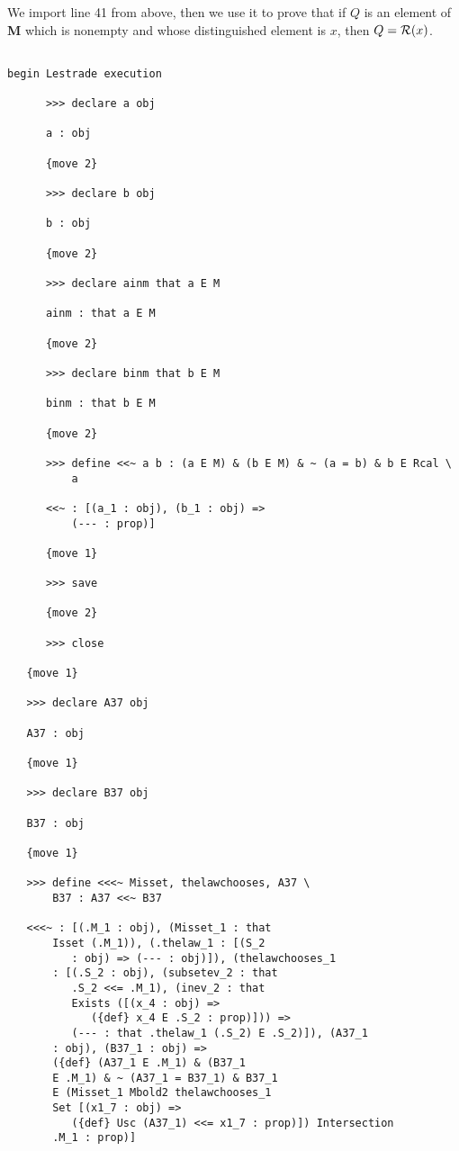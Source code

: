 \documentclass[12pt]{article}
\begin{document}
We import line 41 from above, then we use it to prove that if $Q$ is an element of {\bf M} which is nonempty and whose distinguished element is $x$,
then $Q = {\cal R}(x)$.

\begin{verbatim}

begin Lestrade execution

      >>> declare a obj

      a : obj

      {move 2}

      >>> declare b obj

      b : obj

      {move 2}

      >>> declare ainm that a E M

      ainm : that a E M

      {move 2}

      >>> declare binm that b E M

      binm : that b E M

      {move 2}

      >>> define <<~ a b : (a E M) & (b E M) & ~ (a = b) & b E Rcal \
          a

      <<~ : [(a_1 : obj), (b_1 : obj) => 
          (--- : prop)]

      {move 1}

      >>> save

      {move 2}

      >>> close

   {move 1}

   >>> declare A37 obj

   A37 : obj

   {move 1}

   >>> declare B37 obj

   B37 : obj

   {move 1}

   >>> define <<<~ Misset, thelawchooses, A37 \
       B37 : A37 <<~ B37

   <<<~ : [(.M_1 : obj), (Misset_1 : that 
       Isset (.M_1)), (.thelaw_1 : [(S_2 
          : obj) => (--- : obj)]), (thelawchooses_1 
       : [(.S_2 : obj), (subsetev_2 : that 
          .S_2 <<= .M_1), (inev_2 : that 
          Exists ([(x_4 : obj) => 
             ({def} x_4 E .S_2 : prop)])) => 
          (--- : that .thelaw_1 (.S_2) E .S_2)]), (A37_1 
       : obj), (B37_1 : obj) => 
       ({def} (A37_1 E .M_1) & (B37_1 
       E .M_1) & ~ (A37_1 = B37_1) & B37_1 
       E (Misset_1 Mbold2 thelawchooses_1 
       Set [(x1_7 : obj) => 
          ({def} Usc (A37_1) <<= x1_7 : prop)]) Intersection 
       .M_1 : prop)]


\end{verbatim}
\end{document}
